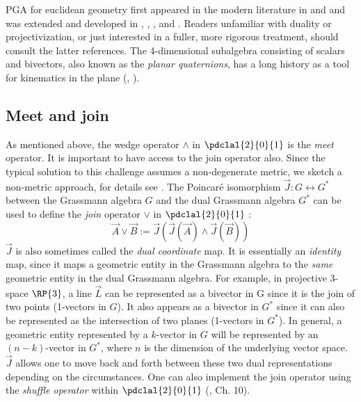 \documentclass[12pt]{article}
\newcommand{\gTh}{\cite{gunnThesis}\xspace}
\begin{document}
{PGA for euclidean geometry first appeared in the modern literature in \cite{selig00} and \cite{selig05} and was extended and developed in \gTh, \cite{gunn2011}, \cite{gunnFull2010}, and \cite{gunn2016}. Readers unfamiliar with duality or projectivization, or just interested in a fuller, more rigorous treatment, should consult the latter references.  The  4-dimensional subalgebra consisting of scalars and bivectors, also known as the \emph{planar quaternions}, has a long history as a tool for kinematics in the plane (\cite{blaschke38}, \cite{mcc}). 

\subsection{Meet and join}

As mentioned above, the wedge operator $\wedge$ in $\pdclal{2}{0}{1}$ is the \emph{meet} operator. It is important to have access to the join operator also.   Since the typical solution to this challenge assumes a non-degenerate metric, we sketch a non-metric approach, for details see \cite{gunnThesis}.
The Poincar\'{e} isomorphism $\vec{J}: G \leftrightarrow G^{*}$ between the Grassmann algebra  $G$ and the dual Grassmann algebra $G^{*}$ can be used to define the \emph{join} operator $\vee$ in $\pdclal{2}{0}{1}$ :
\[ \vec{A} \vee \vec{B} := \vec{J}(\vec{J}(\vec{A}) \wedge \vec{J}(\vec{B})) \]
$\vec{J}$ is also sometimes called the \emph{dual coordinate} map. It is essentially an \emph{identity} map, since it maps a geometric entity in the Grassmann algebra to the \emph{same} geometric entity in the dual Grassmann algebra. For example, in projective 3-space $\RP{3}$, a line $\vec{L}$ can be represented as a bivector in G since it is the join of two points (1-vectors in $G$).  It also appears as a bivector in $G^*$ since it can also be represented as the intersection of two planes (1-vectors in $G^*$). In general, a geometric entity represented by a $k$-vector in $G$ will be represented by an $(n-k)$-vector in $G^*$, where $n$ is the dimension of the underlying vector space.  $\vec{J}$ allows one to move back and forth between these two dual representations depending on the circumstances. One can also implement the join operator using the  \emph{shuffle operator} within $\pdclal{2}{0}{1}$ (\cite{selig05}, Ch. 10).  %

 }
\end{document}
